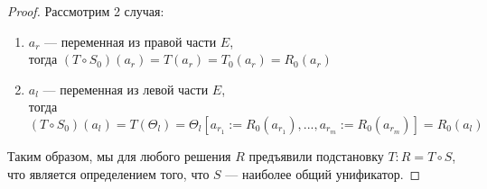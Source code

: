 \begin{proof}
		Рассмотрим 2 случая:
		\begin{enumerate}
			\item $a_r$ — переменная из правой части $E$, \\
			тогда $(T \circ S_0)(a_r) = T(a_r) = T_0(a_r) = R_0(a_r)$
			\item $a_l$ — переменная из левой части $E$, \\
			тогда $(T \circ S_0)(a_l) = T(\Theta_l) = \Theta_l[a_{r_1}:=R_0(a_{r_1}),...,a_{r_m}:=R_0(a_{r_m})] = R_0(a_l)$
		\end{enumerate}
	Таким образом, мы для любого решения $R$ предъявили подстановку $T : R = T \circ S$, что является определением того, что $S$ — наиболее общий унификатор.
	\end{proof}
